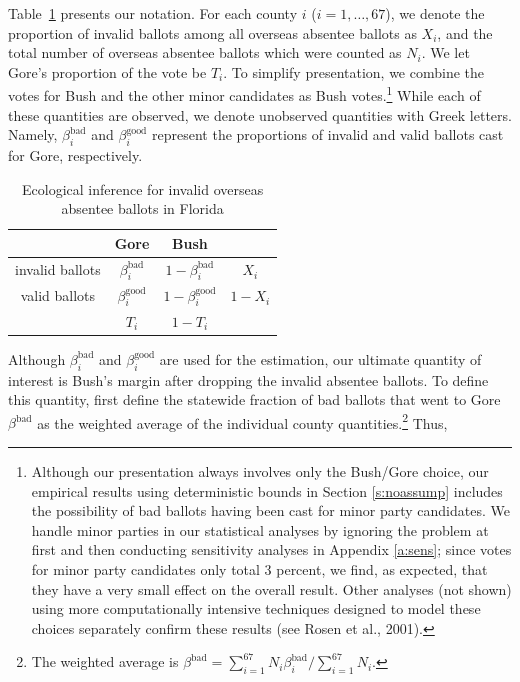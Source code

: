 \documentclass[11pt,titlepage]{article}
\newcommand{\bb}{\beta^{\text{bad}}}
\newcommand{\bg}{\beta^{\text{good}}}
\begin{document}
Table~\ref{tb:ei} presents our notation.  For each county $i$
($i=1,\dots,67$), we denote the proportion of invalid ballots among
all overseas absentee ballots as $X_i$, and the total number of
overseas absentee ballots which were counted as $N_i$.  We let Gore's
proportion of the vote be $T_i$.  To simplify presentation, we combine
the votes for Bush and the other minor candidates as Bush
votes.\footnote{Although our presentation always involves only the
  Bush/Gore choice, our empirical results using deterministic bounds
  in Section \ref{s:noassump} includes the possibility of bad ballots
  having been cast for minor party candidates.  We handle minor
  parties in our statistical analyses by ignoring the problem at first
  and then conducting sensitivity analyses in Appendix \ref{a:sens};
  since votes for minor party candidates only total 3 percent, we
  find, as expected, that they have a very small effect on the overall
  result.  Other analyses (not shown) using more computationally
  intensive techniques designed to model these choices separately
  confirm these results (see Rosen et al., 2001)\nocite{RosJaiKin01}.}
While each of these quantities are observed, we denote unobserved
quantities with Greek letters.  Namely, $\bb_i$ and $\bg_i$ represent
the proportions of invalid and valid ballots cast for Gore,
respectively.
\begin{table}[t]
\begin{center}
\begin{tabular}{cccc}
                & Gore  & Bush &         \\
\hline 
invalid ballots & $\bb_i$  & $1-\bb_i$ & $X_i$   \\
valid ballots   & $\bg_i$  & $1-\bg_i$ & $1-X_i$ \\
\hline
                & $T_i$ & $1-T_i$ &         \\
\end{tabular} \caption{Ecological inference for invalid overseas
  absentee ballots in Florida}\label{tb:ei}
\end{center}
\end{table} 

Although $\bb_i$ and $\bg_i$ are used for the estimation, our ultimate
quantity of interest is Bush's margin after dropping the invalid
absentee ballots.  To define this quantity, first define the statewide
fraction of bad ballots that went to Gore $\bb$ as the weighted
average of the individual county quantities.\footnote{The weighted
  average is $\bb=\sum_{i=1}^{67}N_i\bb_i/\sum_{i=1}^{67}N_i$.}  Thus,
\end{document}
